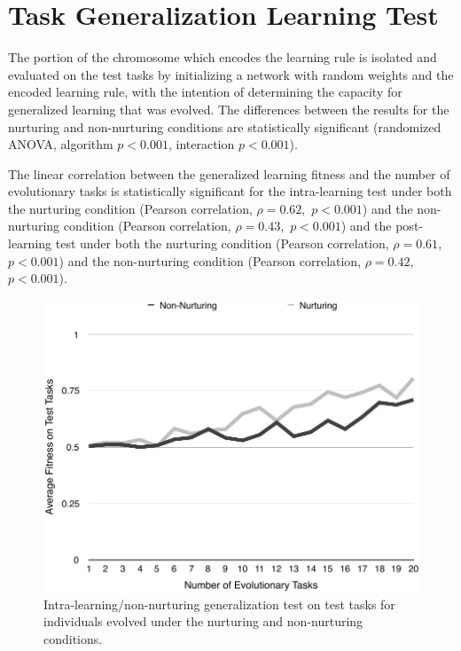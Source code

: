 \documentclass[master]{outhesis}
\begin{document}
\section{Task Generalization Learning Test}

The portion of the chromosome which encodes the learning rule is isolated and evaluated on the test tasks by initializing a network with random weights and the encoded learning rule, with the intention of determining the capacity for generalized learning that was evolved.
The differences between the results for the nurturing and non-nurturing conditions are statistically significant (randomized ANOVA, algorithm $p < 0.001$, interaction $p < 0.001$).

The linear correlation between the generalized learning fitness and the number of evolutionary tasks is statistically significant for
the intra-learning test under both the nurturing condition (Pearson correlation, $\rho=0.62,$ $p < 0.001$) 
and the non-nurturing condition (Pearson correlation, $\rho=0.43,$ $p < 0.001$)
and the post-learning test under both the nurturing condition (Pearson correlation, $\rho=0.61,$ $p < 0.001$)
and the non-nurturing condition (Pearson correlation, $\rho=0.42,$ $p < 0.001$).

\begin{figure}[H]
	\centering
	\includegraphics{NonNurturingGeneralizationTestPlot.pdf}
	\caption{Intra-learning/non-nurturing generalization test on test tasks for individuals evolved under the nurturing and non-nurturing conditions.}
\end{figure}
\end{document}
